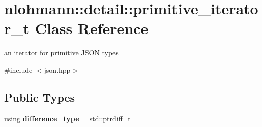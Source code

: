 \hypertarget{classnlohmann_1_1detail_1_1primitive__iterator__t}{}\section{nlohmann\+:\+:detail\+:\+:primitive\+\_\+iterator\+\_\+t Class Reference}
\label{classnlohmann_1_1detail_1_1primitive__iterator__t}


an iterator for primitive J\+S\+ON types  




{\ttfamily \#include $<$json.\+hpp$>$}

\subsection*{Public Types}
\begin{DoxyCompactItemize}
\item 
\mbox{\label{classnlohmann_1_1detail_1_1primitive__iterator__t_af3db0d5c90de427d51645fe73a015553}} 
using {\bfseries difference\+\_\+type} = std\+::ptrdiff\+\_\+t
\end{DoxyCompactItemize}
